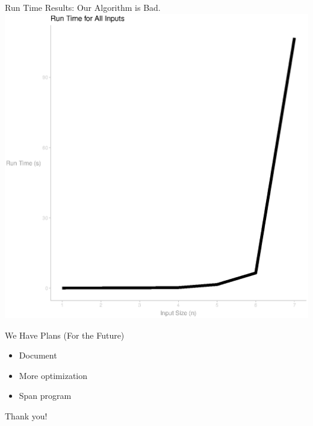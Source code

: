 \documentclass[12pt]{beamer}
\begin{document}
\begin{frame}{Run Time Results: Our Algorithm is Bad.}
\centering
\includegraphics[scale=.5]{figure_all_or_time.eps}
\end{frame}

\begin{frame}{We Have Plans (For the Future)}
\begin{itemize}
    \item Document
    \item More optimization
    \item Span program
\end{itemize} 
\end{frame}

\begin{frame}{Thank you!}


\end{frame}
\end{document}
